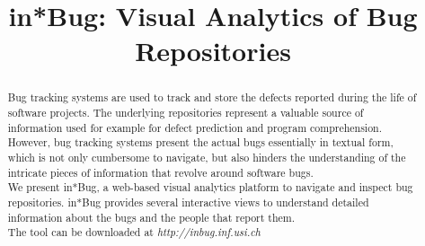 


\usepackage{xspace,graphicx,url,paralist}
\usepackage{xcolor,colortbl}

\usepackage{microtype}


\newcommand{\ie}{\textit{i.e.,}\xspace}
\newcommand{\eg}{\textit{e.g.,}\xspace}
\newcommand{\etc}{\textit{etc.}\xspace}
\newcommand{\etal}{\textit{et al.}\xspace}
\newcommand{\ib}{in*Bug\xspace}
\newcommand{\secref}[1]{Section~\ref{#1}\xspace}
\newcommand{\figref}[1]{Figure~\ref{#1}\xspace}
\newcommand{\tabref}[1]{Table~\ref{#1}\xspace}

\hyphenation{}



\title{in*Bug: Visual Analytics of Bug Repositories}

\author{
}

\maketitle
\IEEEpeerreviewmaketitle

\begin{abstract}

Bug tracking systems are used to track and store the defects reported during the life of software projects. The underlying repositories represent a valuable source of information used for example for defect prediction and program comprehension. However, bug tracking systems present the actual bugs essentially in textual form, which is not only cumbersome to navigate, but also hinders the understanding of the intricate pieces of information that revolve around software bugs.\\
We present in*Bug, a web-based visual analytics platform to navigate and inspect bug repositories. in*Bug provides several interactive views to understand detailed information about the bugs and the people that report them. \\
The tool can be downloaded at \textit{http://inbug.inf.usi.ch}

\end{abstract}

